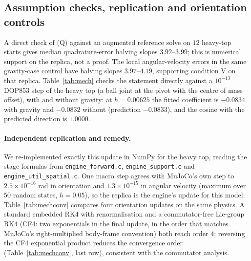 \documentclass[10pt]{article}
\theoremstyle{definition}
\newcommand{\fittable}[2][\linewidth]{%
  \sbox{\tablebox}{#2}%
  \ifdim\wd\tablebox>#1\relax
    \resizebox{#1}{!}{\usebox{\tablebox}}%
  \else
    \usebox{\tablebox}%
  \fi}
\begin{document}
\subsection{Assumption checks, replication and orientation controls}

\noindent A direct check of (Q)
against an augmented reference solve on $12$ heavy-top starts gives
median quadrature-error halving slopes $3.92$--$3.99$; this is numerical
support on the replica, not a proof. The local angular-velocity errors in
the same gravity-case control have halving slopes $3.97$--$4.19$, supporting
condition V on that replica. Table~\ref{tab:mech} checks the statement directly against a
$10^{-13}$ DOP853 step of the heavy top (a ball joint at the pivot with the centre of mass
offset), with and without gravity: at $h=0.00625$ the fitted coefficient is $-0.0834$ with gravity and $-0.0832$ without
(prediction $-0.0833$), and the cosine with the predicted direction is $1.0000$.

\begin{table}[htbp]
\centering\small
\fittable{}
\caption{One-step orientation error $e$ of MuJoCo's update (replica) against the Magnus
prediction $-\tfrac{h^3}{12}\,\omega\times\dot\omega$ (coefficient $-1/12=-0.0833$), $12$ random
states. The cosine is that of $e$ with $-\omega\times\dot\omega$. With gravity the energy
defect falls roughly as $h^3$; torque-free, the same orientation error has no effect on the
energy beyond $O(h^5)$.}
\label{tab:mech}
\end{table}

\paragraph{Independent replication and remedy.} We re-implemented exactly this update
in NumPy for the heavy top, reading
the stage formulas from \texttt{engine\_forward.c}, \texttt{engine\_support.c} and
\texttt{engine\_util\_spatial.c}. One macro step agrees with MuJoCo's own step to
$2.5\times10^{-16}$ rad in orientation and $1.3\times10^{-15}$ in angular velocity
(maximum over $50$ random states, $h=0.05$), so the replica is the engine's update for
this model. Table~\ref{tab:mechconv} compares four orientation updates on the same
physics. A standard embedded RK4 with renormalisation and a commutator-free Lie-group
RK4 \citep{celledoni2003} (CF4: two exponentials in the final update, in the order
that matches MuJoCo's right-multiplied body-frame convention) both reach order $4$;
reversing the CF4 exponential product reduces the convergence order
(Table~\ref{tab:mechconv}, last row), consistent with the commutator analysis.
\end{document}
